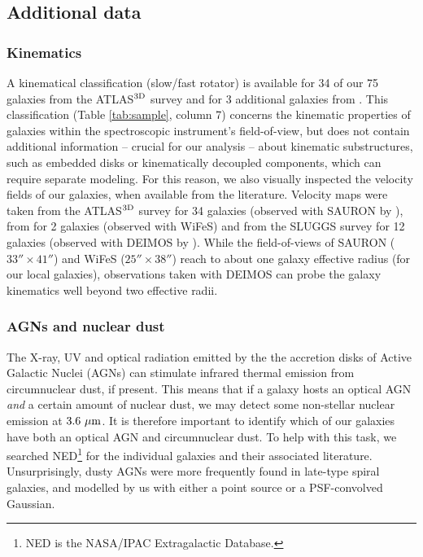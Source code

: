 \documentclass[preprint2]{emulateapj}
\begin{document}
\subsection{Additional data}
\label{sec:adddata}
\subsubsection{Kinematics}
\label{sec:kinem}
A kinematical classification (slow/fast rotator) is available for 34 of our 75 galaxies 
from the ATLAS$^{\rm 3D}$ survey \citep{atlas3dIII-MNRAS} 
and for 3 additional galaxies from \citet{scott2014}.
This classification (Table \ref{tab:sample}, column 7) 
concerns the kinematic properties of galaxies within the spectroscopic instrument's field-of-view, 
but does not contain additional information -- crucial for our analysis -- about kinematic substructures, 
such as embedded disks or kinematically decoupled components, 
which can require separate modeling.
For this reason, we also visually inspected the velocity fields of our galaxies, 
when available from the literature.
Velocity maps were taken from the ATLAS$^{\rm 3D}$ survey for 34 galaxies 
(observed with SAURON by \citealt{krajnovic2011}),
from \citet{scott2014} for 2 galaxies 
(observed with WiFeS)
and from the SLUGGS survey for 12 galaxies 
(observed with DEIMOS by \citealt{arnold2014}).
While the field-of-views of SAURON ($33'' \times 41''$) and WiFeS ($25'' \times 38''$) 
reach to about one galaxy effective radius (for our local galaxies),
observations taken with DEIMOS can probe the galaxy kinematics well beyond two effective radii.

\subsubsection{AGNs and nuclear dust}
The X-ray, UV and optical radiation 
emitted by the the accretion disks of Active Galactic Nuclei (AGNs) can stimulate infrared thermal emission 
from circumnuclear dust, if present. 
This means that if a galaxy hosts an optical AGN \emph{and} a certain amount of nuclear dust,
we may detect some non-stellar nuclear emission at $3.6~\rm \mu m$.
It is therefore important to identify which of our galaxies have both an optical AGN and circumnuclear dust.
To help with this task, we searched NED\footnote{NED is the NASA/IPAC Extragalactic Database.} 
for the individual galaxies and their associated literature.
Unsurprisingly, dusty AGNs were more frequently found in late-type spiral galaxies, 
and modelled by us with either a point source or a PSF-convolved Gaussian.
\end{document}

